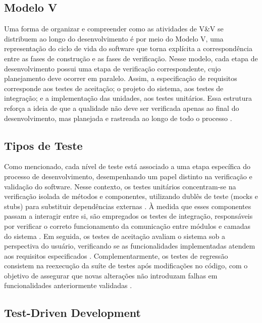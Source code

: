 \subsection{Modelo V}

Uma forma de organizar e compreender como as atividades de V\&V se distribuem ao longo do desenvolvimento é por meio do Modelo V, uma representação do ciclo de vida do software que torna explícita a correspondência entre as fases de construção e as fases de verificação. Nesse modelo, cada etapa de desenvolvimento possui uma etapa de verificação correspondente, cujo planejamento deve ocorrer em paralelo. Assim, a especificação de requisitos corresponde aos testes de aceitação; o projeto do sistema, aos testes de integração; e a implementação das unidades, aos testes unitários. Essa estrutura reforça a ideia de que a qualidade não deve ser verificada apenas ao final do desenvolvimento, mas planejada e rastreada ao longo de todo o processo \cite{sommerville2019}.

\subsection{Tipos de Teste}

Como mencionado, cada nível de teste está associado a uma etapa específica do processo de desenvolvimento, desempenhando um papel distinto na verificação e validação do software. Nesse contexto, os testes unitários concentram-se na verificação isolada de métodos e componentes, utilizando dublês de teste (mocks e stubs) para substituir dependências externas \cite{fowler2007mocks}. À medida que esses componentes passam a interagir entre si, são empregados os testes de integração, responsáveis por verificar o correto funcionamento da comunicação entre módulos e camadas do sistema \cite{sommerville2019}. Em seguida, os testes de aceitação avaliam o sistema sob a perspectiva do usuário, verificando se as funcionalidades implementadas atendem aos requisitos especificados \cite{cohn2004, north2006}. Complementarmente, os testes de regressão consistem na reexecução da suíte de testes após modificações no código, com o objetivo de assegurar que novas alterações não introduzam falhas em funcionalidades anteriormente validadas \cite{sommerville2019}.

\subsection{Test-Driven Development}

